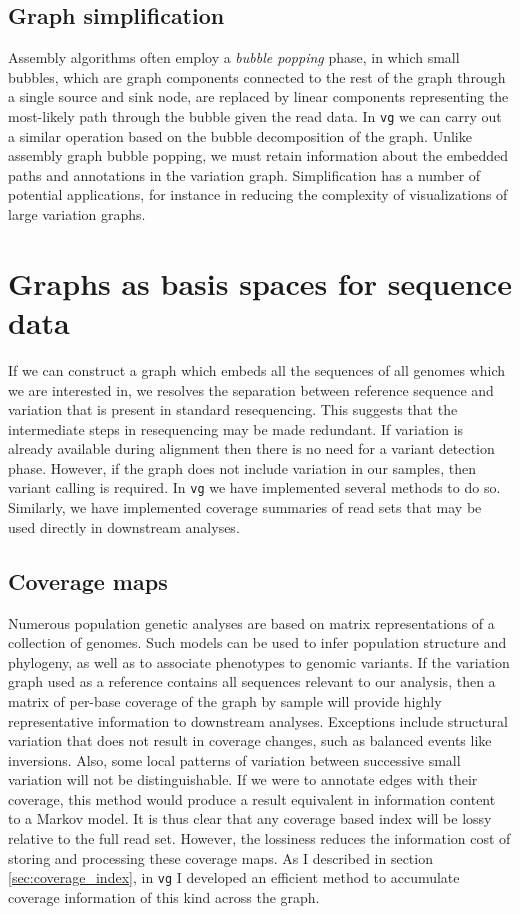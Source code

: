 \documentclass[a4paper,12pt,numbered,oneside]{Classes/PhDThesisPSnPDF}
\begin{document}
\subsection{Graph simplification}

Assembly algorithms often employ a \emph{bubble popping} phase, in which small bubbles, which are graph components connected to the rest of the graph through a single source and sink node, are replaced by linear components representing the most-likely path through the bubble given the read data.
In {\tt vg} we can carry out a similar operation based on the bubble decomposition of the graph.
Unlike assembly graph bubble popping, we must retain information about the embedded paths and annotations in the variation graph.
Simplification has a number of potential applications, for instance in reducing the complexity of visualizations of large variation graphs.

\section{Graphs as basis spaces for sequence data}
\label{sec:basis_space}

If we can construct a graph which embeds all the sequences of all genomes which we are interested in, we resolves the separation between reference sequence and variation that is present in standard resequencing.
This suggests that the intermediate steps in resequencing may be made redundant.
If variation is already available during alignment then there is no need for a variant detection phase.
However, if the graph does not include variation in our samples, then variant calling is required.
In {\tt vg} we have implemented several methods to do so.
Similarly, we have implemented coverage summaries of read sets that may be used directly in downstream analyses.

\subsection{Coverage maps}

Numerous population genetic analyses are based on matrix representations of a collection of genomes.
Such models can be used to infer population structure and phylogeny, as well as to associate phenotypes to genomic variants.
If the variation graph used as a reference contains all sequences relevant to our analysis, then a matrix of per-base coverage of the graph by sample will provide highly representative information to downstream analyses.
Exceptions include structural variation that does not result in coverage changes, such as balanced events like inversions.
Also, some local patterns of variation between successive small variation will not be distinguishable.
If we were to annotate edges with their coverage, this method would produce a result equivalent in information content to a Markov model.
It is thus clear that any coverage based index will be lossy relative to the full read set.
However, the lossiness reduces the information cost of storing and processing these coverage maps.
As I described in section \ref{sec:coverage_index}, in {\tt vg} I developed an efficient method to accumulate coverage information of this kind across the graph.
\end{document}
